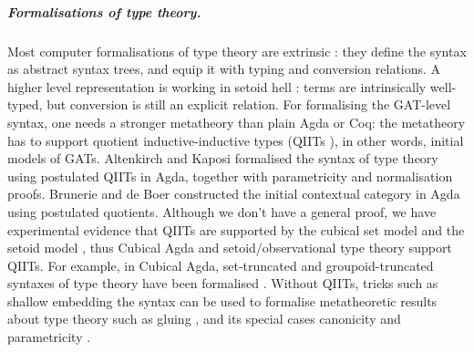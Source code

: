 \documentclass[a4paper,UKenglish]{article}
\begin{document}
\vspace{-1.1em}
\subparagraph*{Formalisations of type theory.}
Most computer formalisations of type theory are extrinsic
\cite{DBLP:journals/pacmpl/0001OV18,DBLP:conf/cpp/AdjedjLMPP24,DBLP:journals/jar/SozeauABCFKMTW20}:
they define the syntax as abstract syntax trees, and equip it with
typing and conversion relations. A higher level representation is
working in setoid hell \cite{chapman09eatitself,setoidhell}: terms are
intrinsically well-typed, but conversion is still an explicit
relation. For formalising the GAT-level syntax, one needs a stronger
metatheory than plain Agda or Coq: the metatheory has to support
quotient inductive-inductive types (QIITs
\cite{DBLP:journals/pacmpl/KaposiKA19}), in other words, initial
models of GATs. Altenkirch and Kaposi
\cite{DBLP:conf/popl/AltenkirchK16} formalised the syntax of type
theory using postulated QIITs in Agda, together with parametricity and
normalisation \cite{lmcs:4005} proofs. Brunerie and de Boer
\cite{initiality-agda} constructed the initial contextual category in
Agda using postulated quotients. Although we don't have a general
proof, we have experimental evidence that QIITs are supported by the
cubical set model \cite{DBLP:conf/lics/CoquandHM18} and the setoid
model \cite{kaposi-qiit-setoid}, thus Cubical Agda
\cite{DBLP:journals/jfp/VezzosiMA21} and setoid/observational type
theory \cite{setoid,DBLP:phd/hal/Pujet22} support QIITs. For example,
in Cubical Agda, set-truncated and groupoid-truncated syntaxes of type
theory have been formalised \cite{cohtt}. Without QIITs, tricks such
as shallow embedding the syntax can be used to formalise metatheoretic
results about type theory such as gluing
\cite{kaposi_et_al:LIPIcs:2019:10532}, and its special cases
canonicity and parametricity \cite{kaposi-shallow}.
\end{document}
